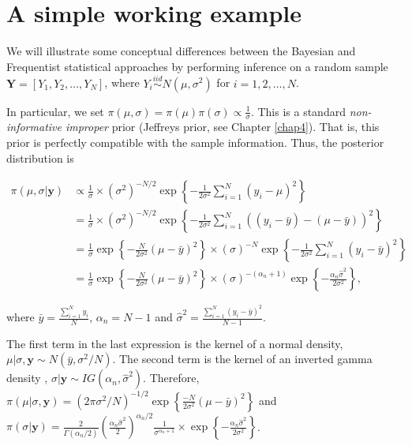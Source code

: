 \section{A simple working example}\label{sec26}

We will illustrate some conceptual differences between the Bayesian and Frequentist statistical approaches by performing inference on a random sample $\mathbf{Y} = [Y_1, Y_2, \dots, Y_N]$, where $Y_i \stackrel{iid}{\sim} N(\mu, \sigma^2)$ for $i = 1, 2, \dots, N$.

In particular, we set $\pi(\mu, \sigma) = \pi(\mu) \pi(\sigma) \propto \frac{1}{\sigma}$. This is a standard \textit{non-informative improper} prior (Jeffreys prior, see Chapter \ref{chap4}). That is, this prior is perfectly compatible with the sample information. Thus, the posterior distribution is

\begin{align*}
	\pi(\mu,\sigma|\mathbf{y})&\propto \frac{1}{\sigma}\times (\sigma^2)^{-N/2}\exp\left\{-\frac{1}{2\sigma^2}\sum_{i=1}^N (y_i-\mu)^2\right\}\\
	&= \frac{1}{\sigma}\times (\sigma^2)^{-N/2}\exp\left\{-\frac{1}{2\sigma^2}\sum_{i=1}^N ((y_i-\bar{y}) - (\mu-\bar{y}))^2\right\}\\
	&=  \frac{1}{\sigma}\exp\left\{-\frac{N}{2\sigma^2}(\mu-\bar{y})^2\right\}\times (\sigma)^{-N}\exp\left\{-\frac{1}{2\sigma^2}\sum_{i=1}^N (y_i-\bar{y})^2\right\}\\
	&=  \frac{1}{\sigma}\exp\left\{-\frac{N}{2\sigma^2}(\mu-\bar{y})^2\right\}\times (\sigma)^{-(\alpha_n+1)}\exp\left\{-\frac{\alpha_n\hat{\sigma}^2}{2\sigma^2}\right\},	
\end{align*}

where $\bar{y}=\frac{\sum_{i=1}^N y_i}{N}$, $\alpha_n=N-1$ and $\hat{\sigma}^2=\frac{\sum_{i=1}^N (y_i-\bar{y})^2}{N-1}$.

The first term in the last expression is the kernel of a normal density, $\mu|\sigma,\mathbf{y}\sim N(\bar{y},\sigma^2/N)$. The second term is the kernel of an inverted gamma density \cite[p.~371]{zellner1996introduction}, $\sigma|\mathbf{y}\sim IG(\alpha_n,\hat{\sigma}^2)$. Therefore, $\pi(\mu|\sigma,\mathbf{y})=(2\pi\sigma^2/N)^{-1/2}\exp\left\{\frac{-N}{2\sigma^2}(\mu-\bar{y})^2\right\}$ and $\pi(\sigma|\mathbf{y})=\frac{2}{\Gamma(\alpha_n/2)}\left(\frac{\alpha_n\hat{\sigma}^2}{2}\right)^{\alpha_n/2}\frac{1}{\sigma^{\alpha_n+1}}\times\exp\left\{-\frac{\alpha_n\hat{\sigma}^2}{2\sigma^2}\right\}$.

